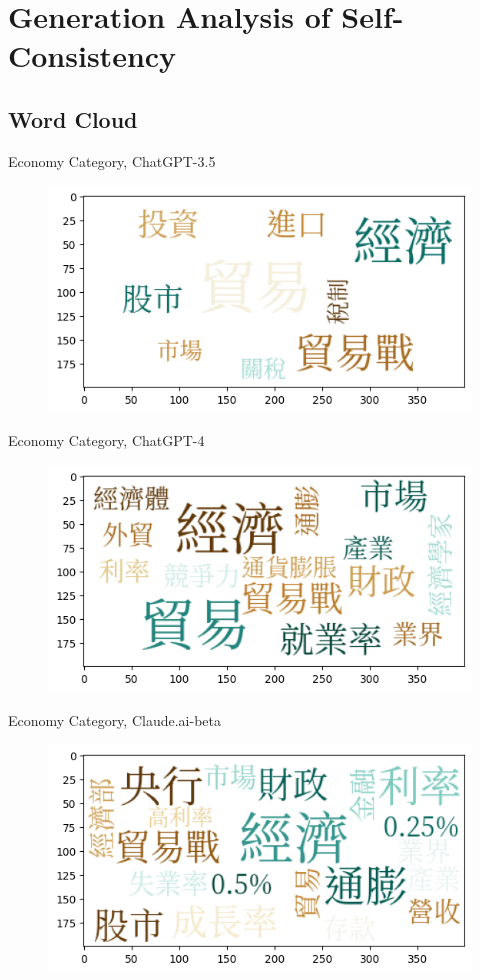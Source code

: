 \documentclass[12pt]{beamer}
\begin{document}
\section{Generation Analysis of Self-Consistency}


\subsection{Word Cloud}
\begin{frame}{Economy Category, ChatGPT-3.5}
\begin{figure}[H]
\centering
\includegraphics[width=11.5cm]{Figures/fig1.png}
\end{figure}
\end{frame}


\begin{frame}{Economy Category, ChatGPT-4}
\begin{figure}[H]
\centering
\includegraphics[width=11.5cm]{Figures/fig2.png}
\end{figure}
\end{frame}


\begin{frame}{Economy Category, Claude.ai-beta}
\begin{figure}[H]
\centering
\includegraphics[width=11.5cm]{Figures/fig3.png}
\end{figure}
\end{frame}
\end{document}
